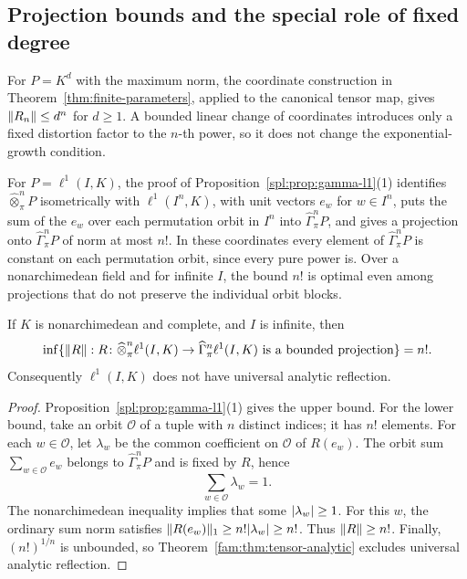 \subsection{Projection bounds and the special role of fixed degree}
For $P=K^d$ with the maximum norm, the coordinate construction in
Theorem~\ref{thm:finite-parameters}, applied to the canonical tensor map, gives
$\lVert R_n\rVert\le d^n$ for $d\ge1$. A bounded linear change of coordinates introduces only a fixed
distortion factor to the $n$\nobreakdash-th power, so it does not change the exponential-growth condition.

For $P=\ell^1(I,K)$, the proof of Proposition~\ref{spl:prop:gamma-l1}(1) identifies $\widehat\otimes^n_\pi P$
isometrically with $\ell^1(I^n,K)$, with unit vectors $e_w$ for $w\in I^n$, puts the sum of the $e_w$ over each
permutation orbit in $I^n$ into $\widehat\Gamma^n_\pi P$, and gives a projection onto $\widehat\Gamma^n_\pi P$ of norm
at most $n!$. In these coordinates every element of $\widehat\Gamma^n_\pi P$ is constant on each permutation orbit,
since every pure power is.
Over a nonarchimedean field and for infinite $I$, the bound $n!$ is optimal even among projections that
do not preserve the individual orbit blocks.

\begin{proposition}\label{fam:prop:l1-optimal}
If $K$ is nonarchimedean and complete, and $I$ is infinite, then
\[
 \inf\{\lVert R\rVert:R\colon \widehat\otimes^n_\pi\ell^1(I,K)\to\widehat\Gamma^n_\pi\ell^1(I,K)
                  \text{ is a bounded projection}\}=n!.
\]
Consequently $\ell^1(I,K)$ does not have universal analytic reflection.
\end{proposition}

\begin{proof}
Proposition~\ref{spl:prop:gamma-l1}(1) gives the upper bound. For the lower bound, take an orbit $\mathcal O$
of a tuple with $n$ distinct indices; it has $n!$ elements. For each $w\in\mathcal O$, let $\lambda_w$
be the common coefficient on $\mathcal O$ of $R(e_w)$.
The orbit sum $\sum_{w\in\mathcal O}e_w$ belongs to $\widehat\Gamma^n_\pi P$ and is fixed by $R$, hence
\[
 \sum_{w\in\mathcal O}\lambda_w=1.
\]
The nonarchimedean inequality implies that some $\lvert \lambda_w\rvert\ge1$.
For this $w$, the ordinary sum norm satisfies
$\lVert R(e_w)\rVert_1\ge n!\lvert \lambda_w\rvert\ge n!$.
Thus $\lVert R\rVert\ge n!$. Finally, $(n!)^{1/n}$ is unbounded, so
Theorem~\ref{fam:thm:tensor-analytic} excludes universal analytic reflection.
\end{proof}

